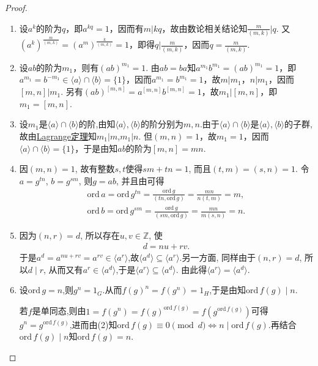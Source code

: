 \documentclass[../../main.tex]{subfiles}%
\begin{document}
\begin{proof}
\begin{enumerate}[(1)]
注意到$ba = b(ab)b^{-1}$,故只需取$g=b$,则由上述证明知$ab$与$ba$有相同的阶.

\item 设$a^k$的阶为$q$，即$a^{kq}=1$，因而有$m|kq$，故由数论相关结论知$\frac{m}{(m,k)}|q$. 又$(a^k)^{\frac{m}{(m,k)}}=(a^m)^{\frac{k}{(m,k)}}=1$，即得$q|\frac{m}{(m,k)}$，因而$q=\frac{m}{(m,k)}.$

\item 设$ab$的阶为$m_1$，则有$(ab)^{m_1}=1$. 由$ab=ba$知$a^{m_1}b^{m_1}=(ab)^{m_1}=1$，即$a^{m_1}=b^{-m_1}\in\langle a\rangle\cap\langle b\rangle=\{1\}$，因而$a^{m_1}=b^{m_1}=1$，故$m|m_1$，$n|m_1$，因而$[m,n]|m_1$. 另有$(ab)^{[m,n]}=a^{[m,n]}b^{[m,n]}=1$，故$m_1|[m,n]$，即$m_1=[m,n]$.

\item 设$m_1$是$\langle a\rangle\cap\langle b\rangle$的阶,由知$\langle a\rangle,\langle b\rangle$的阶分别为$m,n$.由于$\langle a\rangle\cap\langle b\rangle$是$\langle a\rangle,\langle b\rangle$的子群,故由\hyperref[theorem:抽象代数--Lagrange定理]{Lagrange定理}知$m_1|m$,$m_1|n$. 但$(m,n)=1$，故$m_1=1$，因而$\langle a\rangle\cap\langle b\rangle=\{1\}$，于是由知$ab$的阶为$[m,n]=mn$.

\item 因$(m,n)=1$, 故有整数$s,t$使得$sm+tn=1$, 而且$(t,m)=(s,n)=1$.
令$a=g^{tn}$, $b=g^{sm}$, 则$g=ab$, 并且由可得
\begin{align*}
\text{ord}\,a=\text{ord}\,g^{tn}=\frac{\text{ord}\,g}{(tn,\text{ord}\,g)}=\frac{mn}{n(t,m)}=m,
\\
\text{ord}\,b=\text{ord}\,g^{sm}=\frac{\text{ord}\,g}{(sm,\text{ord}\,g)}=\frac{mn}{m(s,n)}=n.
\end{align*}

\item 因为$(n,r)=d$, 所以存在$u,v\in\mathbb{Z}$, 使
\begin{align*}
d=nu+rv.
\end{align*}
于是$a^d=a^{nu+rv}=a^{rv}\in\langle a^r\rangle$,故$\langle a^d \rangle\subseteq \langle a^r \rangle$.另一方面, 同样由于$(n,r)=d$, 所以$d\mid r$, 从而又有$a^r\in\langle a^d\rangle$,于是$\langle a^r\rangle\subseteq \langle a^d\rangle$. 由此得$\langle a^r\rangle=\langle a^d\rangle$.

\item 设$\text{ord}\,g=n$,则$g^n=1_G$.从而$f\left( g \right) ^n=f\left( g^n \right) =1_H$,于是由知$\text{ord}\,f\left( g \right) \mid n$.

若$f$是单同态,则由$1=f(g^n)=f(g)^{\text{ord}\,f(g)}=f(g^{\text{ord}\,f(g)})$可得$g^n=g^{\text{ord}\,f(g)}$,进而由(2)知$\text{ord}\,f(g)\equiv 0 \pmod d \iff n\mid \text{ord}\,f(g)$.再结合$\text{ord}\,f\left( g \right) \mid n$知$\text{ord}\,f\left( g \right) =n$.
\end{enumerate}
\end{proof}
\end{document}
